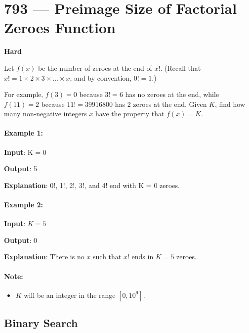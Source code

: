 \section{793 --- Preimage Size of Factorial Zeroes Function}

\textbf{Hard}

Let $ f(x) $ be the number of zeroes at the end of $ x! $. (Recall that $ x! = 1 \times 2 \times 3 \times \ldots \times x $, and by convention, $0! = 1$.)

For example, $ f(3) = 0 $ because $ 3! = 6 $ has no zeroes at the end, while $ f(11) = 2 $ because $ 11! = 39916800 $ has 2 zeroes at the end. Given $ K $, find how many non-negative integers $ x $ have the property that $ f(x) = K $.

\paragraph{Example 1:}

\begin{flushleft}
\textbf{Input}: K = 0

\textbf{Output}: 5

\textbf{Explanation}: 0!, 1!, 2!, 3!, and 4! end with K = 0 zeroes.
\end{flushleft}

\paragraph{Example 2:}

\begin{flushleft}
\textbf{Input}: $ K = 5 $

\textbf{Output}: 0

\textbf{Explanation}: There is no $ x $ such that $ x! $ ends in $ K = 5 $ zeroes.
\end{flushleft}

\paragraph{Note:}

\begin{itemize}
\item $ K $ will be an integer in the range $ [0, 10^9] $.
\end{itemize}

\subsection{Binary Search}

